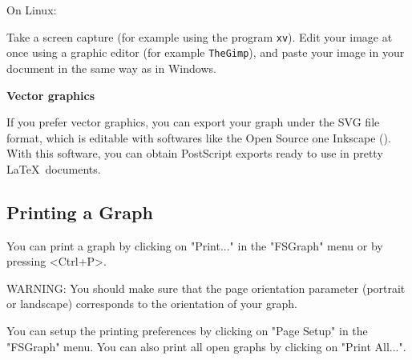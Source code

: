 \bigskip
\noindent On Linux:

\bigskip
\noindent Take a screen capture (for example using the program \verb+xv+). Edit
your image at once using a graphic editor (for example \verb+TheGimp+), and paste
your image in your document in the same way as in Windows.

\newpage
\noindent\textbf{Vector graphics}

\bigskip
\noindent If you prefer vector graphics, you can export your graph under the
SVG file format, which is editable with softwares like the Open Source
one Inkscape (\cite{Inkscape}). With this software, you can obtain PostScript
exports ready to use in pretty \LaTeX~documents.

\subsection{Printing a Graph}

You can print a graph by clicking on "Print..." in the "FSGraph" menu or by
pressing <Ctrl+P>.

\bigskip
\noindent WARNING: You should make sure that the page orientation parameter
(portrait or landscape) corresponds  to the orientation of your graph.

\bigskip
\noindent You can setup the printing preferences by clicking on "Page Setup"
in the "FSGraph" menu. You can also print all open graphs by clicking on "Print
All...".


